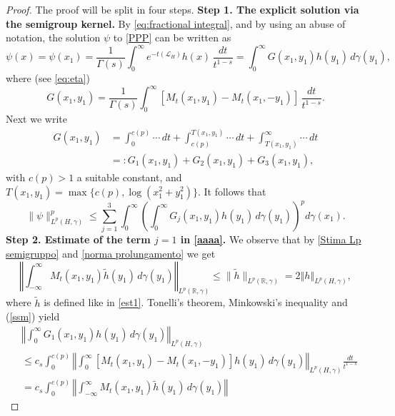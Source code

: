 \documentclass[a4paper,10pt,reqno]{amsart}
\newcommand{\R}{\mathbb{R}}
\numberwithin{equation}{section}
\begin{document}
\begin{proof}
The proof will be split in four steps.
\newline
\noindent\textbf{Step 1. The explicit solution via the semigroup kernel.}
By \eqref{eq:fractional integral}, and by using an abuse of notation, the solution $\psi$ to \eqref{PPP} can be written as
$$\psi(x)=\psi(x_{1})=\frac{1}{\Gamma(s)}
\int_0^\infty e^{-t(\mathcal{L}_H)}h(x)\,\frac{dt}{t^{1-s}}
=\int_{0}^{\infty}G(x_{1},y_{1})h(y_{1})\,d\gamma(y_{1}),$$
where (see \eqref{eq:eta})
$$G(x_{1},y_{1})=\frac{1}{\Gamma(s)}\int_{0}^{\infty}[M_{t}(x_{1},y_{1})-M_{t}(x_{1},-y_{1})]\,\frac{dt}{t^{1-s}}.$$
Next we write
\begin{equation}\label{G}
\begin{aligned}
G(x_{1},y_{1})&=\int_{0}^{c(p)}\cdots\,dt+\int_{c(p)}^{T(x_{1},y_{1})}\cdots\,dt+\int_{T(x_{1},y_{1})}^{\infty}\cdots\,dt \\
&=:G_{1}(x_{1},y_{1})+G_{2}(x_{1},y_{1})+G_{3}(x_{1},y_{1}),
\end{aligned}
\end{equation}
with $c(p)>1$ a suitable constant, and $T(x_{1},y_{1})=\max\{c(p),\log\left(
x_{1}^{2}+y_{1}^{2}\right)  \}.$
It follows that
\begin{equation}\label{aaaa}
\|\psi\|_{L^{p}(H,\gamma)}^{p}
\leq\sum_{j=1}^3\int_{0}^{\infty}\left(\int_{0}^{\infty}G_{j}(x_{1},y_{1})h(y_{1})\,d\gamma(y_{1})\right)^{p}d\gamma(x_{1}).
\end{equation}
\noindent\textbf{Step 2. Estimate of the term $j=1$ in \eqref{aaaa}.} We observe that by
\eqref{Stima Lp semigruppo} and \eqref{norma prolungamento} we get
\begin{equation}\label{ssm}
  \left\Vert \int_{-\infty}^{\infty}M_{t}(x_{1},y_{1})\widetilde
{h}(y_{1})\,d\gamma(y_{1})\right\Vert _{L^{p}(\R,\gamma)}
  \leq\|\widetilde{h}\|_{L^{p}(\mathbb{R},\gamma)}
=2\left\Vert h\right\Vert _{L^{p}(H,\gamma)},
\end{equation}
where $\widetilde{h}$ is defined like in \eqref{est1}. Tonelli's theorem,
Minkowski's inequality and (\ref{ssm}) yield%
\begin{align*}
&  \left\Vert \int_{0}^{\infty}G_{1}(x_{1},y_{1})h(y_{1})\,d\gamma(y_{1})\right\Vert _{L^{p}(H,\gamma)}\\
&  \leq c_s\int_{0}^{c(p)}\left\Vert \int_{0}^{\infty}\left[
M_{t}(x_{1},y_{1})-M_{t}(x_{1},-y_{1})\right]
h(y_{1})\,d\gamma(y_{1})\right\Vert _{L^{p}(H,\gamma)}\frac{dt}{t^{1-s}}\\
&=c_s\int_{0}^{c(p)}\left\Vert \int_{-\infty}^{\infty}M_{t}(x_{1},y_{1})\widetilde{h}(y_{1})\,d\gamma(y_{1})\right\Vert

\end{align*}
\end{proof}
\end{document}
